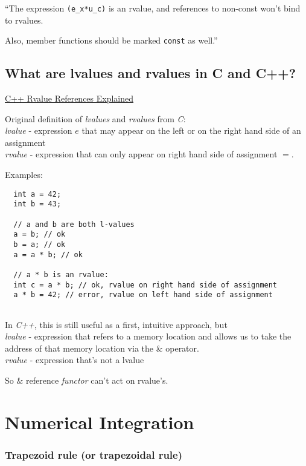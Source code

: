 \documentclass[10pt]{amsart}
\begin{document}
\begin{multicols*}{2}
``The expression \verb|(e_x*u_c)| is an rvalue, and references to non-const won't bind to rvalues.

Also, member functions should be marked \verb|const| as well.''  

\subsection{What are lvalues and rvalues in C and C++?}

\href{http://thbecker.net/articles/rvalue_references/section_01.html}{C++ Rvalue References Explained}

Original definition of \emph{lvalues} and \emph{rvalues} from \emph{C}: \\
\emph{lvalue} - expression $e$ that may appear on the left or on the right hand side of an assignment \\
\emph{rvalue} - expression that can only appear on right hand side of assignment $=$.

Examples:

\begin{lstlisting}
  int a = 42;
  int b = 43;

  // a and b are both l-values
  a = b; // ok
  b = a; // ok
  a = a * b; // ok

  // a * b is an rvalue:
  int c = a * b; // ok, rvalue on right hand side of assignment
  a * b = 42; // error, rvalue on left hand side of assignment
  
  \end{lstlisting}

In \emph{C++}, this is still useful as a first, intuitive approach, but \\
\emph{lvalue} - expression that refers to a memory location and allows us to take the address of that memory location via the $\&$ operator. \\
\emph{rvalue} - expression that's not a lvalue

So $\&$ reference \emph{functor} can't act on rvalue's.



\section{Numerical Integration}

\subsubsection{Trapezoid rule (or trapezoidal rule)}


\end{multicols*}
\end{document}
